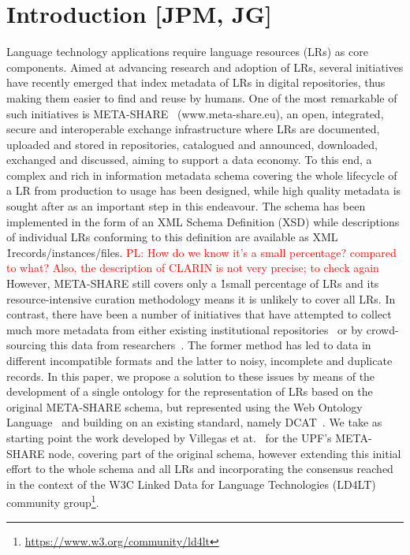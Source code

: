 \documentclass{llncs}
\begin{document}
\section{Introduction [JPM, JG]}
\label{sec:introduction}
Language technology applications require language resources (LRs) as core components. Aimed at advancing research and adoption of LRs, several initiatives have recently emerged that index metadata of LRs in digital repositories, thus making them easier to find and reuse by humans. One of the most remarkable of such initiatives is META-SHARE~\cite{piperidis2012meta} (www.meta-share.eu), an open, integrated, secure and interoperable exchange infrastructure where LRs are documented, uploaded and stored in repositories, catalogued and announced, downloaded, exchanged and discussed, aiming to support a data economy. To this end, a complex and rich in information metadata schema covering the whole lifecycle of a LR from production to usage has been designed, while high quality metadata is sought after as an important step in this endeavour. The schema has been implemented in the form of an XML Schema Definition (XSD) while descriptions of individual LRs conforming to this definition are available as XML \h1{records/instances/files}.
\textcolor{red}{PL: How do we know it's a small percentage? compared to what? Also, the description of CLARIN is not very precise; to check again}
However, META-SHARE still covers only a \h1{small percentage of LRs} and its
resource-intensive curation methodology means it is unlikely to cover all
LRs. In contrast, there have been a number of initiatives that have
attempted to collect much more metadata from either existing institutional
repositories~\cite[CLARIN]{broeder2010data} or by crowd-sourcing this data from
researchers~\cite[LRE-Map]{calzolari2012lre}. The former method has led to
data in different incompatible formats and the latter to noisy, incomplete and
duplicate records.
In this paper, we propose a solution to these issues by means of the development
of a single ontology for the representation of LRs based on the
original META-SHARE schema, but represented using the Web Ontology
Language~\cite{motik2012owl} and building on an existing standard, namely
DCAT~\cite{maali2014data}.
We take as starting point the work developed by Villegas et at.~\cite{Villegas2014} for the UPF's META-SHARE node, covering part of the original schema, however extending this initial effort to the whole schema and all LRs and incorporating the consensus reached in the context of the W3C Linked Data for Language Technologies (LD4LT) community group\footnote{\url{https://www.w3.org/community/ld4lt}}.
\end{document}
